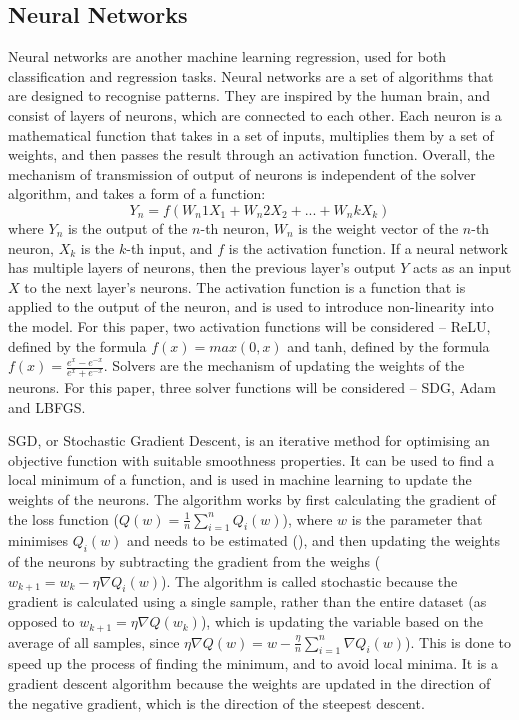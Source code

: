 \documentclass[12pt]{report}
\begin{document}
\subsection{Neural Networks}
Neural networks are another machine learning regression, used for both classification and regression tasks. Neural networks are a set of algorithms that are designed to recognise patterns. They are inspired by the human brain, and consist of layers of neurons, which are connected to each other. Each neuron is a mathematical function that takes in a set of inputs, multiplies them by a set of weights, and then passes the result through an activation function. Overall, the mechanism of transmission of output of neurons is independent of the solver algorithm, and takes a form of a function:
\begin{equation}
	Y_n = f(W_n1X_1 + W_n2X_2 + ... + W_nkX_k)
\end{equation}
where $Y_n$ is the output of the $n$-th neuron, $W_n$ is the weight vector of the $n$-th neuron, $X_k$ is the $k$-th input, and $f$ is the activation function. If a neural network has multiple layers of neurons, then the previous layer's output $Y$ acts as an input $X$ to the next layer's neurons. The activation function is a function that is applied to the output of the neuron, and is used to introduce non-linearity into the model. For this paper, two activation functions will be considered -- ReLU, defined by the formula $f(x) = max(0,x)$ and tanh, defined by the formula $f(x) = \frac{e^{x}-e^{-x}}{e^{x}+e^{-x}}$. Solvers are the mechanism of updating the weights of the neurons. For this paper, three solver functions will be considered -- SDG, Adam and LBFGS.

SGD, or Stochastic Gradient Descent, is an iterative method for optimising an objective function with suitable smoothness properties. It can be used to find a local minimum of a function, and is used in machine learning to update the weights of the neurons. The algorithm works by first calculating the gradient of the loss function ($Q(w)=\frac{1}{n}\sum_{i=1}^{n}Q_i(w)$), where $w$ is the parameter that minimises $Q_i(w)$ and needs to be estimated (\cite{sra2011}), and then updating the weights of the neurons by subtracting the gradient from the weighs ($w_{k+1}=w_{k}-\eta\nabla Q_i(w)$). The algorithm is called stochastic because the gradient is calculated using a single sample, rather than the entire dataset (as opposed to $w_{k+1}=\eta\nabla Q(w_k)$), which is updating the variable based on the average of all samples, since $\eta\nabla Q(w)=w-\frac{\eta}{n}\sum_{i=1}^{n}\nabla Q_i(w)$). This is done to speed up the process of finding the minimum, and to avoid local minima. It is a gradient descent algorithm because the weights are updated in the direction of the negative gradient, which is the direction of the steepest descent.
\end{document}
